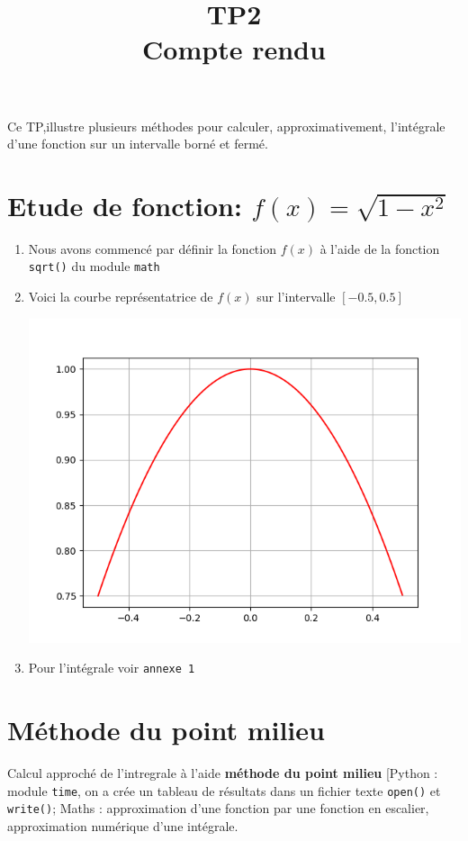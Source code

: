 \documentclass{article}
\title{TP2\\ Compte rendu}
\begin{document}
\maketitle


Ce TP,illustre plusieurs méthodes pour calculer, approximativement, l'intégrale d'une fonction sur un intervalle borné et fermé.


\section{Etude de fonction: $f(x) = \sqrt{1 - x^2}$}
\begin{enumerate}
\item
Nous avons commencé par définir la fonction $f(x)$ à l'aide de la fonction \texttt{sqrt()} du module \texttt{math}
\item
Voici la courbe représentatrice de $f(x)$ sur l'intervalle $[-0.5, 0.5]$
\begin{center}
    \includegraphics[scale=0.5]{figure_1.png}
\end{center}
\item
Pour l'intégrale voir \texttt{annexe 1}
\end{enumerate}


\section{Méthode du point milieu}
Calcul approché de l'intregrale à l'aide {\bf méthode du point milieu} [Python : module \texttt{time}, on a crée un tableau de résultats dans un fichier texte \texttt{open()} et \texttt{write()}; Maths : approximation d'une fonction par une fonction en escalier, approximation numérique d'une intégrale.
\end{document}
